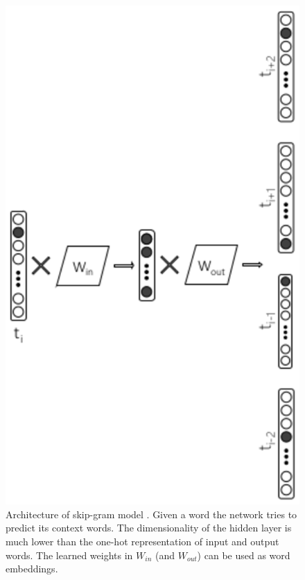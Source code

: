 \begin{figure}[t]
	\begin{center} 
    	\includegraphics[scale=0.99]{Figures/skip_gram.eps}
		\caption{Architecture of skip-gram model \parencite{mitra2018introduction}. Given a word the network tries to predict its context words. The dimensionality of the hidden layer is much lower than the one-hot representation of input and output words. The learned weights in $W_{in}$ (and $W_{out}$) can be used as word embeddings.}
		\label{chap:word_embeddingss:fig:skipgram_diagram}
	\end{center}
\end{figure}

